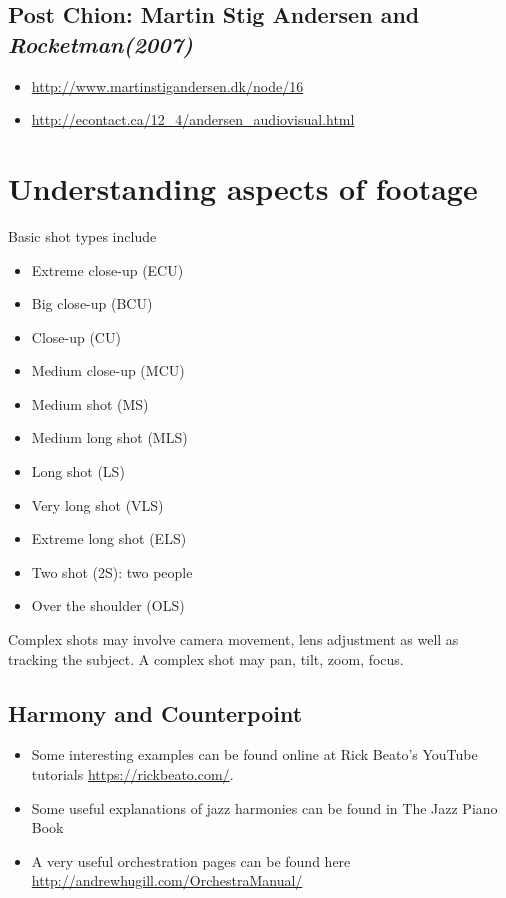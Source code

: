 \subsection{Post Chion: Martin Stig Andersen and \textit{Rocketman(2007)}}
\begin{itemize}
\item \url{http://www.martinstigandersen.dk/node/16}
\item \url{http://econtact.ca/12_4/andersen_audiovisual.html}
\end{itemize}

\section{Understanding aspects of footage}
Basic shot types include
\begin{itemize}
\item Extreme close-up (ECU)
\item Big close-up (BCU)
\item Close-up (CU)
\item Medium close-up (MCU)
\item Medium shot (MS)
\item Medium long shot (MLS)
\item Long shot (LS)
\item Very long shot (VLS)
\item Extreme long shot (ELS)
\item Two shot (2S): two people
\item Over the shoulder (OLS)
\end{itemize}

Complex shots may involve camera movement, lens adjustment as well as tracking the subject. A complex shot may pan, tilt, zoom, focus. 

\subsection{Harmony and Counterpoint}
\begin{itemize}
\item Some interesting examples can be found online at Rick Beato's YouTube tutorials \url{https://rickbeato.com/}. 
\item Some useful explanations of jazz harmonies can be found in The Jazz Piano Book \citep{levine2011jazz}
\item A very useful orchestration pages can be found here \url{http://andrewhugill.com/OrchestraManual/}
\end{itemize}

